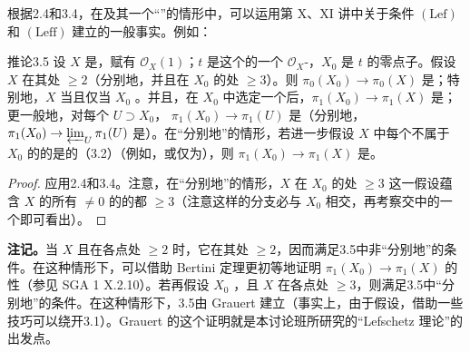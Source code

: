 根据2.4和3.4，在及其一个“”的情形中，可以运用第 X、XI 讲中关于条件 $(\mathrm{Lef})$ 和 $(\mathrm{Leff})$ 建立的一般事实。例如：
\begin{SGAresult}{推论}{3.5}
设 $X$ 是，赋有 $\mathcal O_X(1)$；$t$ 是这个的一个 $\mathcal O_X$-，$X_0$ 是 $t$ 的零点子。假设 $X$ 在其处 $\geq2$（分别地，并且在 $X_0$ 的处 $\geq3$）。则 $\pi_0(X_0)\to\pi_0(X)$ 是；特别地，$X$ 当且仅当 $X_0$ 。并且，在 $X_0$ 中选定一个后，$\pi_1(X_0)\to\pi_1(X)$ 是；更一般地，对每个 $U\supset X_0$， $\pi_1(X_0)\to\pi_1(U)$ 是（分别地， $\pi_1(X_0)\to\varprojlim_U\pi_1(U)$ 是）。在“分别地”的情形，若进一步假设 $X$ 中每个不属于 $X_0$ 的的是的（3.2）（例如，或仅为），则 $\pi_1(X_0)\to\pi_1(X)$ 是。
\end{SGAresult}
\begin{proof}
应用2.4和3.4。注意，在“分别地”的情形，$X$ 在 $X_0$ 的处 $\geq3$ 这一假设蕴含 $X$ 的所有 $\neq0$ 的的都 $\geq3$（注意这样的分支必与 $X_0$ 相交，再考察交中的一个即可看出）。
\end{proof}
\textbf{注记。}当 $X$ 且在各点处 $\geq2$ 时，它在其处 $\geq2$，因而满足3.5中非“分别地”的条件。在这种情形下，可以借助 Bertini 定理更初等地证明 $\pi_1(X_0)\to\pi_1(X)$ 的性（参见 SGA 1 X.2.10）。若再假设 $X_0$ ，且 $X$ 在各点处 $\geq3$，则满足3.5中“分别地”的条件。在这种情形下，3.5由 Grauert 建立（事实上，由于假设，借助一些技巧可以绕开3.1）。Grauert 的这个证明就是本讨论班所研究的“Lefschetz 理论”的出发点。

